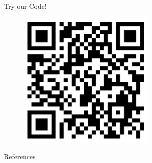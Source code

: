 \documentclass[usenames,dvipsnames,mathserif,notheorems]{beamer}
\begin{document}


\begin{frame}{}
	\begin{center}
		\huge Try our Code!
	\end{center}

	\begin{figure}[]
		\centering
		\includegraphics[width=0.6\textwidth]{assets/github.png}
	\end{figure}
\end{frame}

\begin{frame}[allowframebreaks]{References}
	\printbibliography[]
\end{frame}
\end{document}
